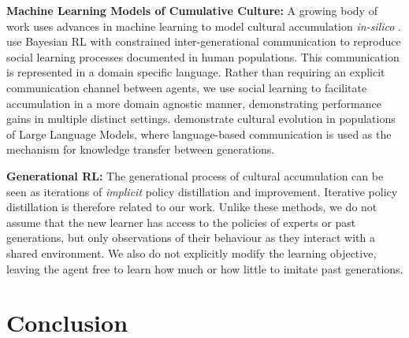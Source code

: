 \documentclass{article}
\begin{document}
\textbf{Machine Learning Models of Cumulative Culture:} A growing body of work uses advances in machine learning to model cultural accumulation \textit{in-silico} \citep{prystawski23, perez23, perez24}. \cite{perez24} use Bayesian RL with constrained inter-generational communication to reproduce social learning processes documented in human populations. This communication is represented in a domain specific language. Rather than requiring an explicit communication channel between agents, we use social learning to facilitate accumulation in a more domain agnostic manner, demonstrating performance gains in multiple distinct settings. \cite{prystawski23} demonstrate cultural evolution in populations of Large Language Models, where language-based communication is used as the mechanism for knowledge transfer between generations.


\textbf{Generational RL:} The generational process of cultural accumulation can be seen as iterations of \textit{implicit} policy distillation and improvement. Iterative policy distillation  \citep{schmitt2018kickstarting, Stooke21} is therefore related to our work. Unlike these methods, we do not assume that the new learner has access to the policies of experts or past generations, but only observations of their behaviour as they interact with a shared environment. We also do not explicitly modify the learning objective, leaving the agent free to learn how much or how little to imitate past generations. 

\section{Conclusion}
\end{document}
